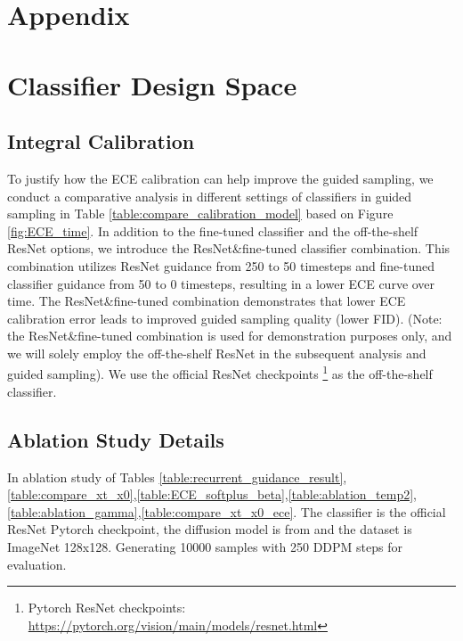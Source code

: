 \documentclass{article}
\theoremstyle{definition}
\begin{document}
\section*{Appendix}


\section{Classifier Design Space}\label{appendix:design_space}
\subsection{Integral Calibration}\label{appendix:integral_calibration}

To justify how the ECE calibration can help improve the guided sampling, we conduct a comparative analysis in different settings of classifiers in guided sampling in Table \ref{table:compare_calibration_model} based on Figure \ref{fig:ECE_time}. In addition to the fine-tuned classifier and the off-the-shelf ResNet options, we introduce the ResNet\&fine-tuned classifier combination. This combination utilizes ResNet guidance from 250 to 50 timesteps and fine-tuned classifier guidance from 50 to 0 timesteps, resulting in a lower ECE curve over time. The ResNet\&fine-tuned combination demonstrates that lower ECE calibration error leads to improved guided sampling quality (lower FID\citep{heusel2017gans}). (Note: the ResNet\&fine-tuned combination is used for demonstration purposes only, and we will solely employ the off-the-shelf ResNet in the subsequent analysis and guided sampling). We use the official ResNet checkpoints \footnote{Pytorch ResNet checkpoints: \url{https://pytorch.org/vision/main/models/resnet.html}} as the off-the-shelf classifier.

\subsection{Ablation Study Details}\label{appendix:ablation_study_detail}
In ablation study of Tables \ref{table:recurrent_guidance_result},\ref{table:compare_xt_x0},\ref{table:ECE_softplus_beta},\ref{table:ablation_temp2},\ref{table:ablation_gamma},\ref{table:compare_xt_x0_ece}. The classifier is the official ResNet Pytorch checkpoint, the diffusion model is from \cite{dhariwal2021diffusion} and the dataset is ImageNet 128x128. Generating 10000 samples with 250 DDPM steps for evaluation.
\end{document}
